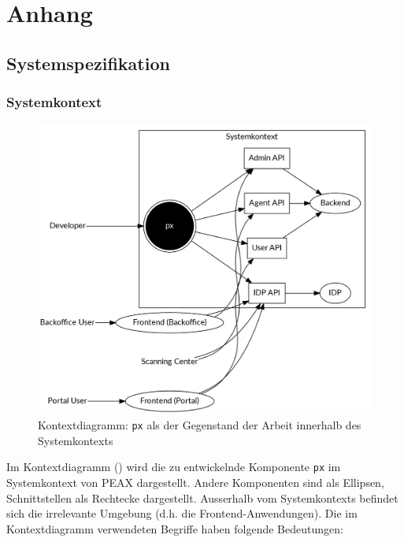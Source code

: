 \section{Anhang}

\subsection{Systemspezifikation}

\subsubsection{Systemkontext}
\label{sec:Systemkontext}

\begin{figure}
	\centering
	\includegraphics[width=\linewidth]{pics/kontextdiagramm.png}
	\caption{Kontextdiagramm: \texttt{px} als der Gegenstand der Arbeit innerhalb des Systemkontexts}
	\label{fig:kontextdiagramm}
\end{figure}

Im Kontextdiagramm () wird die zu entwickelnde Komponente \texttt{px} im Systemkontext von PEAX dargestellt. Andere Komponenten sind als Ellipsen, Schnittstellen als Rechtecke dargestellt. Ausserhalb vom Systemkontexts befindet sich die irrelevante Umgebung (d.h. die Frontend-Anwendungen). Die im Kontextdiagramm verwendeten Begriffe haben folgende Bedeutungen:

